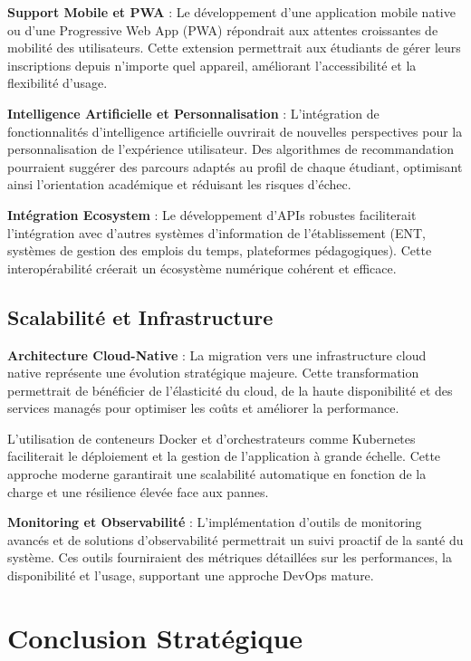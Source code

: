 \documentclass[12pt,a4paper]{report}
\begin{document}
\textbf{Support Mobile et PWA} : Le développement d'une application mobile native ou d'une Progressive Web App (PWA) répondrait aux attentes croissantes de mobilité des utilisateurs. Cette extension permettrait aux étudiants de gérer leurs inscriptions depuis n'importe quel appareil, améliorant l'accessibilité et la flexibilité d'usage.

\textbf{Intelligence Artificielle et Personnalisation} : L'intégration de fonctionnalités d'intelligence artificielle ouvrirait de nouvelles perspectives pour la personnalisation de l'expérience utilisateur. Des algorithmes de recommandation pourraient suggérer des parcours adaptés au profil de chaque étudiant, optimisant ainsi l'orientation académique et réduisant les risques d'échec.

\textbf{Intégration Ecosystem} : Le développement d'APIs robustes faciliterait l'intégration avec d'autres systèmes d'information de l'établissement (ENT, systèmes de gestion des emplois du temps, plateformes pédagogiques). Cette interopérabilité créerait un écosystème numérique cohérent et efficace.

\subsection{Scalabilité et Infrastructure}

\textbf{Architecture Cloud-Native} : La migration vers une infrastructure cloud native représente une évolution stratégique majeure. Cette transformation permettrait de bénéficier de l'élasticité du cloud, de la haute disponibilité et des services managés pour optimiser les coûts et améliorer la performance.

L'utilisation de conteneurs Docker et d'orchestrateurs comme Kubernetes faciliterait le déploiement et la gestion de l'application à grande échelle. Cette approche moderne garantirait une scalabilité automatique en fonction de la charge et une résilience élevée face aux pannes.

\textbf{Monitoring et Observabilité} : L'implémentation d'outils de monitoring avancés et de solutions d'observabilité permettrait un suivi proactif de la santé du système. Ces outils fourniraient des métriques détaillées sur les performances, la disponibilité et l'usage, supportant une approche DevOps mature.

\section{Conclusion Stratégique}
\end{document}
